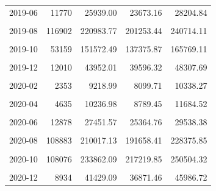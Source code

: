 \begin{longtable}[t]{crrrr}
2019-06 & 11770 & 25939.00 & 23673.16 & 28204.84\\
\cellcolor{gray!10}{2019-07} & \cellcolor{gray!10}{23525} & \cellcolor{gray!10}{61931.09} & \cellcolor{gray!10}{58292.54} & \cellcolor{gray!10}{65569.64}\\
2019-08 & 116902 & 220983.77 & 201253.44 & 240714.11\\
\cellcolor{gray!10}{2019-09} & \cellcolor{gray!10}{130143} & \cellcolor{gray!10}{268306.34} & \cellcolor{gray!10}{249068.49} & \cellcolor{gray!10}{287544.20}\\
2019-10 & 53159 & 151572.49 & 137375.87 & 165769.11\\
\cellcolor{gray!10}{2019-11} & \cellcolor{gray!10}{34568} & \cellcolor{gray!10}{91340.23} & \cellcolor{gray!10}{83906.10} & \cellcolor{gray!10}{98774.35}\\
2019-12 & 12010 & 43952.01 & 39596.32 & 48307.69\\
\cellcolor{gray!10}{2020-01} & \cellcolor{gray!10}{5139} & \cellcolor{gray!10}{17015.88} & \cellcolor{gray!10}{14661.29} & \cellcolor{gray!10}{19370.48}\\
2020-02 & 2353 & 9218.99 & 8099.71 & 10338.27\\
\cellcolor{gray!10}{2020-03} & \cellcolor{gray!10}{7014} & \cellcolor{gray!10}{12047.50} & \cellcolor{gray!10}{10794.55} & \cellcolor{gray!10}{13300.44}\\
2020-04 & 4635 & 10236.98 & 8789.45 & 11684.52\\
\cellcolor{gray!10}{2020-05} & \cellcolor{gray!10}{5955} & \cellcolor{gray!10}{13783.37} & \cellcolor{gray!10}{12220.90} & \cellcolor{gray!10}{15345.83}\\
2020-06 & 12878 & 27451.57 & 25364.76 & 29538.38\\
\cellcolor{gray!10}{2020-07} & \cellcolor{gray!10}{27940} & \cellcolor{gray!10}{76006.86} & \cellcolor{gray!10}{70351.98} & \cellcolor{gray!10}{81661.74}\\
2020-08 & 108883 & 210017.13 & 191658.41 & 228375.85\\
\cellcolor{gray!10}{2020-09} & \cellcolor{gray!10}{202617} & \cellcolor{gray!10}{342179.99} & \cellcolor{gray!10}{312712.03} & \cellcolor{gray!10}{371647.96}\\
2020-10 & 108076 & 233862.09 & 217219.85 & 250504.32\\
\cellcolor{gray!10}{2020-11} & \cellcolor{gray!10}{20877} & \cellcolor{gray!10}{75597.95} & \cellcolor{gray!10}{67138.85} & \cellcolor{gray!10}{84057.05}\\
2020-12 & 8934 & 41429.09 & 36871.46 & 45986.72\\

\end{longtable}
